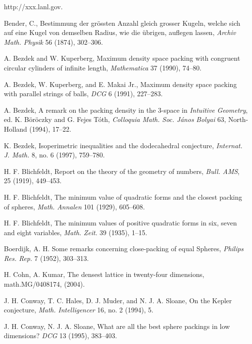 
 http://xxx.lanl.gov.

  Bender, C., Bestimmung der gr\"ossten Anzahl gleich
grosser Kugeln, welche sich auf eine Kugel von demselben Radius, wie
die \"ubrigen, auflegen lassen, {\it Archiv Math. Physik} 56 (1874),
302--306.

 A. Bezdek and W. Kuperberg, Maximum density space packing with
    congruent circular cylinders of infinite length,
    {\it Mathematica} 37 (1990), 74--80.

 A. Bezdek, W. Kuperberg, and E. Makai Jr., Maximum density
    space packing with parallel strings of balls,
    {\it DCG} 6 (1991), 227--283.

 A. Bezdek, A remark on the packing density in the 3-space
    in {\it Intuitive Geometry}, ed. K. B\"or\"oczky and G. Fejes
    T\'oth, {\it Colloquia Math. Soc. J\'anos Bolyai} 63, North-Holland
    (1994), 17--22.

 K. Bezdek, Isoperimetric inequalities and the dodecahedral
    conjecture, {\it Internat. J. Math.} 8, no. 6 (1997), 759--780.

 H. F. Blichfeldt,
    Report on the theory of the geometry of numbers,
    {\it Bull. AMS}, 25 (1919), 449--453.

 H. F. Blichfeldt,
    The minimum value of quadratic forms and the closest
    packing of spheres, {\it Math. Annalen} 101 (1929), 605--608.

 H. F. Blichfeldt,
    The minimum values of positive quadratic forms in six,
    seven and eight variables, {\it Math. Zeit.} 39 (1935), 1--15.

 Boerdijk, A. H. Some remarks concerning close-packing
of equal Spheres, {\it Philips Res. Rep.} 7 (1952), 303--313.

 H. Cohn, A. Kumar, The densest lattice in twenty-four
dimensions, math.MG/0408174, (2004).

 J. H. Conway, T. C. Hales, D. J. Muder, and N. J. A. Sloane,
    On the Kepler conjecture, {\it Math. Intelligencer} 16,
    no. 2 (1994), 5.

  J. H. Conway,  N. J. A. Sloane, What are all the
best sphere packings in low dimensions? {\it DCG} 13 (1995),
383--403.

